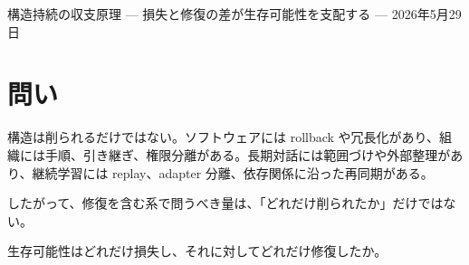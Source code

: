 \documentclass[12pt,a4paper]{article}
\begin{document}
\PaperTitleBlock
  {構造持続の収支原理}
  {— 損失と修復の差が生存可能性を支配する —}
  {2026年5月29日}

\begin{abstract}
構造持続の最小形式は、修復を明示しない収縮モードとして

\[
S = M e^{-L}
\]

を与える。ここで \(L\) は、維持対象 \(F\) を担う構造 \(K\) の生存可能領域 \(V_K\) がどれだけ縮小したかを対数比で測った累積段階損失量である。

本稿は、この最小核を、修復・冗長化・外部支援・ロールバックを含む形式へ拡張する。維持対象 \(F\)、担い手 \(K\)、生存可能領域 \(V_K\)、測度 \(m\) は事前に固定されているものとする。各時点の段階損失量を \(d_{t}\)、修復量を \(r_{t}\) とし、その差

\[
b_{t} := d_{t}-r_{t}
\]

を純損失量と呼ぶ。有限時間地平 \(n\) までの累積純損失量を

\[
B_{n} := \sum_{t<n} b_{t}
\]

と置けば、生存可能領域の質量は

\[
m(V_{n}) = m(V_0) e^{-B_{n}}
\]

と書ける。有効資源を明示する読者向けの形式では

\[
S_{n} = M_{n} e^{-B_{n}}
\]

である。

この式は、構造持続の最小核 \(S=Me^{-L}\) を置き換えるものではない。修復量がない場合、すなわち \(r_{t}=0\) の場合には \(B_{n}=L_{n}\) となり、最小形式に戻る。本稿の中心主張は、修復を含む系では、構造持続を決めるのは損失量そのものではなく、損失量と修復量の差である、という一点にある。

本稿の意義は、修復を含む系でも指数核は失われず、損失量ではなく累積純損失量 \(B\) が生存可能性を支配することを示す点にある。
\end{abstract}

\section{問い}\label{ux554fux3044}

構造は削られるだけではない。ソフトウェアには rollback や冗長化があり、組織には手順、引き継ぎ、権限分離がある。長期対話には範囲づけや外部整理があり、継続学習には replay、adapter 分離、依存関係に沿った再同期がある。

したがって、修復を含む系で問うべき量は、「どれだけ削られたか」だけではない。

生存可能性はどれだけ損失し、それに対してどれだけ修復したか。
\end{document}
